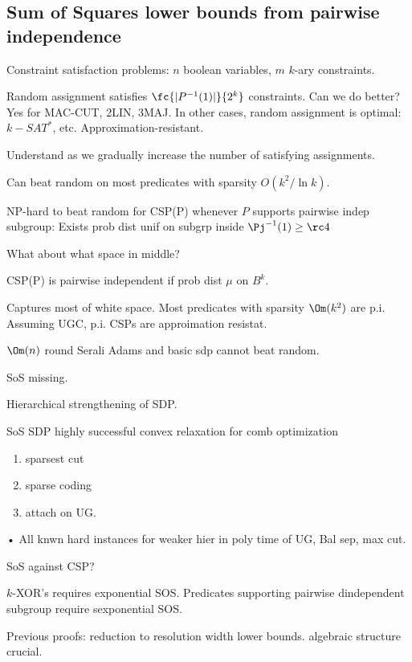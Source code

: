 \subsection{Sum of Squares lower bounds from pairwise independence}

Constraint satisfaction problems: $n$ boolean variables, $m$ $k$-ary constraints.


Random assignment satisfies $\fc{|P^{-1}(1)|}{2^k}$ constraints. Can we do better? Yes for MAC-CUT, 2LIN, 3MAJ. In other cases, random assignment is optimal: $k-SAT^*$, etc. Approximation-resistant.

Understand as we gradually increase the number of satisfying assignments. 

Can beat random on most predicates with sparsity $O(k^2/\ln k)$.

NP-hard to beat random for CSP(P) whenever $P$ supports pairwise indep subgroup: Exists prob dist unif on subgrp inside $\Pj^{-1}(1)\ge \rc 4$

What about what space in middle?

CSP(P) is pairwise independent if prob dist $\mu$ on $B^k$.

Captures most of white space. Most predicates with sparsity $\Om(k^2)$ are p.i. Assuming UGC, p.i. CSPs are approimation resistat.

$\Om(n)$ round Serali Adams and basic sdp cannot beat random.

SoS missing. 

Hierarchical strengthening of SDP.

SoS SDP highly successful convex relaxation for comb optimization
\begin{enumerate}
\item
sparsest cut
\item 
sparse coding
\item
attach on UG.
\end{enumerate}•
All knwn hard instances for weaker hier in poly time of UG, Bal sep, max cut.

SoS against CSP?

$k$-XOR's requires exponential SOS. Predicates supporting pairwise dindependent subgroup require sexponential SOS. 


Previous proofs: reduction to resolution width lower bounds. algebraic structure crucial.

